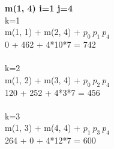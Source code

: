 \documentclass{article}
\begin{document}
    \textbf{m(1, 4) i=1 j=4} \\
    k=1 \\
    m(1, 1) + m(2, 4) + $ p_{0}\ p_{1}\  p_{4}$\\
    0 + 462 + 4*10*7 = 742 \\\\

    k=2 \\
    m(1, 2) + m(3, 4) + $ p_{0}\ p_{2}\  p_{4}$\\
    120 + 252 + 4*3*7 = 456\\\\

    k=3 \\
    m(1, 3) + m(4, 4) + $ p_{1}\ p_{3}\  p_{4}$\\
    264 + 0 + 4*12*7 = 600\\\\
\end{document}
